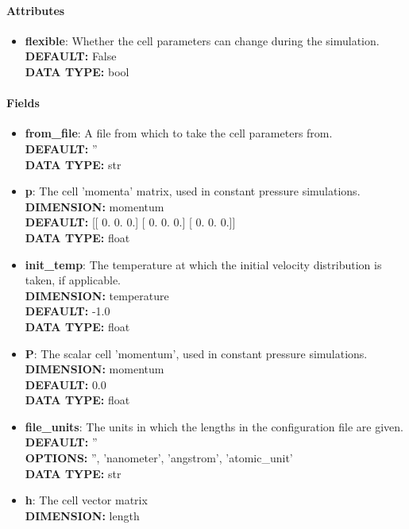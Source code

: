 \begin{itemize}
\paragraph{Attributes}
 \begin{itemize}
\item {\bf flexible}:
 Whether the cell parameters can change during the simulation.
{\\ \bf DEFAULT: }False
{\\ \bf DATA TYPE: }bool
\end{itemize}
 
\paragraph{Fields}
 \begin{itemize}
\item {\bf from\_file}:
 A file from which to take the cell parameters from.
{\\ \bf DEFAULT: }''
{\\ \bf DATA TYPE: }str
\item {\bf p}:
 The cell 'momenta' matrix, used in constant pressure simulations.
{\\ \bf DIMENSION: }momentum
{\\ \bf DEFAULT: }
      [[ 0.  0.  0.]
       [ 0.  0.  0.]
       [ 0.  0.  0.]]
{\\ \bf DATA TYPE: }float
\item {\bf init\_temp}:
 The temperature at which the initial velocity distribution is taken, if applicable.
{\\ \bf DIMENSION: }temperature
{\\ \bf DEFAULT: }-1.0
{\\ \bf DATA TYPE: }float
\item {\bf P}:
 The scalar cell 'momentum', used in constant pressure simulations.
{\\ \bf DIMENSION: }momentum
{\\ \bf DEFAULT: }0.0
{\\ \bf DATA TYPE: }float
\item {\bf file\_units}:
 The units in which the lengths in the configuration file are given.
{\\ \bf DEFAULT: }''
{\\ \bf OPTIONS: }'', 'nanometer', 'angstrom', 'atomic\_unit'
{\\ \bf DATA TYPE: }str
\item {\bf h}:
 The cell vector matrix
{\\ \bf DIMENSION: }length

\end{itemize}
\end{itemize}

